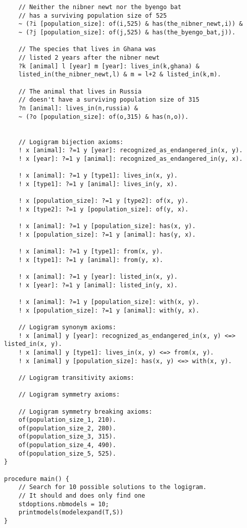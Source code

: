 \begin{lstlisting}
    // Neither the nibner newt nor the byengo bat
    // has a surviving population size of 525
    ~ (?i [population_size]: of(i,525) & has(the_nibner_newt,i)) &
    ~ (?j [population_size]: of(j,525) & has(the_byengo_bat,j)).

    // The species that lives in Ghana was
    // listed 2 years after the nibner newt
    ?k [animal] l [year] m [year]: lives_in(k,ghana) &
    listed_in(the_nibner_newt,l) & m = l+2 & listed_in(k,m).

    // The animal that lives in Russia
    // doesn't have a surviving population size of 315
    ?n [animal]: lives_in(n,russia) &
    ~ (?o [population_size]: of(o,315) & has(n,o)).


    // Logigram bijection axioms:
    ! x [animal]: ?=1 y [year]: recognized_as_endangered_in(x, y).
    ! x [year]: ?=1 y [animal]: recognized_as_endangered_in(y, x).

    ! x [animal]: ?=1 y [type1]: lives_in(x, y).
    ! x [type1]: ?=1 y [animal]: lives_in(y, x).

    ! x [population_size]: ?=1 y [type2]: of(x, y).
    ! x [type2]: ?=1 y [population_size]: of(y, x).

    ! x [animal]: ?=1 y [population_size]: has(x, y).
    ! x [population_size]: ?=1 y [animal]: has(y, x).

    ! x [animal]: ?=1 y [type1]: from(x, y).
    ! x [type1]: ?=1 y [animal]: from(y, x).

    ! x [animal]: ?=1 y [year]: listed_in(x, y).
    ! x [year]: ?=1 y [animal]: listed_in(y, x).

    ! x [animal]: ?=1 y [population_size]: with(x, y).
    ! x [population_size]: ?=1 y [animal]: with(y, x).

    // Logigram synonym axioms:
    ! x [animal] y [year]: recognized_as_endangered_in(x, y) <=> listed_in(x, y).
    ! x [animal] y [type1]: lives_in(x, y) <=> from(x, y).
    ! x [animal] y [population_size]: has(x, y) <=> with(x, y).

    // Logigram transitivity axioms:

    // Logigram symmetry axioms:

    // Logigram symmetry breaking axioms:
    of(population_size_1, 210).
    of(population_size_2, 280).
    of(population_size_3, 315).
    of(population_size_4, 490).
    of(population_size_5, 525).
}

procedure main() {
    // Search for 10 possible solutions to the logigram.
    // It should and does only find one
    stdoptions.nbmodels = 10;
    printmodels(modelexpand(T,S))
}
\end{lstlisting}
